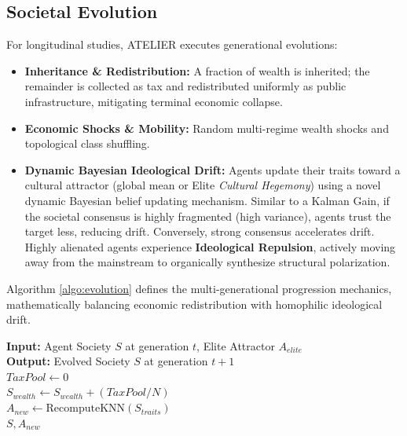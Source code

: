 \documentclass[12pt]{IEEEtran}
\begin{document}
\subsection{Societal Evolution}
For longitudinal studies, ATELIER executes generational evolutions:
\begin{itemize}
    \item \textbf{Inheritance \& Redistribution:} A fraction of wealth is inherited; the remainder is collected as tax and redistributed uniformly as public infrastructure, mitigating terminal economic collapse.
    \item \textbf{Economic Shocks \& Mobility:} Random multi-regime wealth shocks and topological class shuffling.
    \item \textbf{Dynamic Bayesian Ideological Drift:} Agents update their traits toward a cultural attractor (global mean or Elite \textit{Cultural Hegemony}) using a novel dynamic Bayesian belief updating mechanism. Similar to a Kalman Gain, if the societal consensus is highly fragmented (high variance), agents trust the target less, reducing drift. Conversely, strong consensus accelerates drift. Highly alienated agents experience \textbf{Ideological Repulsion}, actively moving away from the mainstream to organically synthesize structural polarization.
\end{itemize}

Algorithm \ref{algo:evolution} defines the multi-generational progression mechanics, mathematically balancing economic redistribution with homophilic ideological drift.

\begin{algorithm}
\caption{Generational Evolution and Drift}
\label{algo:evolution}
\SetAlgoLined
\textbf{Input:} Agent Society $S$ at generation $t$, Elite Attractor $A_{elite}$ \\
\textbf{Output:} Evolved Society $S$ at generation $t+1$ \\
$TaxPool \gets 0$ \\
$S_{wealth} \gets S_{wealth} + (TaxPool / N)$ \\
$A_{new} \gets \text{RecomputeKNN}(S_{traits})$ \\
\Return $S, A_{new}$
\end{algorithm}
\end{document}
